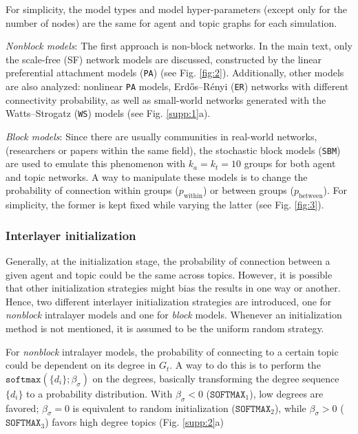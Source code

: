 \documentclass{svproc}
\begin{document}
For simplicity, the model types and model hyper-parameters (except only for the number of nodes) are the same for agent and topic graphs for each simulation.

\textit{Nonblock models}: The first approach is non-block networks.
In the main text, only the scale-free (SF) network models are discussed, constructed by the linear preferential attachment models (\texttt{PA}) \cite{Barabasi1999-dw} (see Fig. \ref{fig:2}).
Additionally, other models are also analyzed: nonlinear \texttt{PA} models, Erdős–Rényi (\texttt{ER}) networks \cite{Erdos1959-dj} with different connectivity probability, as well as small-world networks generated with the Watts–Strogatz (\texttt{WS}) models \cite{Watts1998-vh} (see Fig. \ref{supp:1}a).

\textit{Block models}: Since there are usually communities in real-world networks, (researchers or papers within the same field), the stochastic block models (\texttt{SBM}) \cite{Faust1992-xo} are used to emulate this phenomenon with $k_a = k_t = 10$ groups for both agent and topic networks.
A way to manipulate these models is to change the probability of connection within groups ($p_{\mathrm{within}}$) or between groups ($p_{\mathrm{between}}$).
For simplicity, the former is kept fixed while varying the latter (see Fig. \ref{fig:3}).

\vspace{-1em}
\subsubsection*{Interlayer initialization}

Generally, at the initialization stage, the probability of connection between a given agent and topic could be the same across topics.
However, it is possible that other initialization strategies might bias the results in one way or another.
Hence, two different interlayer initialization strategies are introduced, one for \textit{nonblock} intralayer models and one for \textit{block} models. Whenever an initialization method is not mentioned, it is assumed to be the uniform random strategy.

For \textit{nonblock} intralayer models, the probability of connecting to a certain topic could be dependent on its degree in $G_t$.
A way to do this is to perform the $\texttt{softmax}\left(\{d_i\}; \beta_{\sigma}\right)$ on the degrees, basically transforming the degree sequence $\{d_i\}$ to a probability distribution.
With $\beta_{\sigma} < 0$ ($\texttt{SOFTMAX}_1$), low degrees are favored; $\beta_{\sigma} = 0$ is equivalent to random initialization ($\texttt{SOFTMAX}_2$), while $\beta_{\sigma} > 0$  ($\texttt{SOFTMAX}_3$) favors high degree topics (Fig. \ref{supp:2}a)
\end{document}
